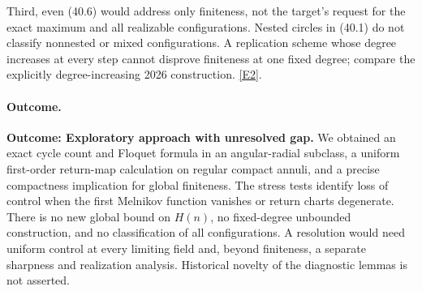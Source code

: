 \documentclass[11pt,a4paper]{article}
\newcommand{\eref}[2]{\hyperlink{extra:#1:#2}{[E#2]}}
\numberwithin{equation}{section}
\begin{document}
Third, even (40.6) would address only finiteness, not the target's request
for the exact maximum and all realizable configurations. Nested circles
in (40.1) do not classify nonnested or mixed configurations. A replication
scheme whose degree increases at every step cannot disprove finiteness at
one fixed degree; compare the explicitly degree-increasing 2026
construction. \eref{statement}{2}.

\paragraph{Outcome.}
\textbf{Outcome: Exploratory approach with unresolved gap.}
We obtained an exact cycle count and Floquet formula in an angular-radial
subclass, a uniform first-order return-map calculation on regular compact
annuli, and a precise compactness implication for global finiteness.
The stress tests identify loss of control when the first Melnikov function
vanishes or return charts degenerate. There is no new global bound on
$H(n)$, no fixed-degree unbounded construction, and no classification of
all configurations. A resolution would need uniform control at every
limiting field and, beyond finiteness, a separate sharpness and realization
analysis. Historical novelty of the diagnostic lemmas is not asserted.
\end{document}
